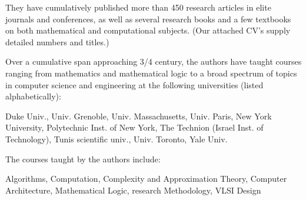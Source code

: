 \documentclass{article}[12pt]
\begin{document}
\smallskip

\noindent
They have cumulatively published more than 450 research articles in elite journals and conferences, as well as several research books and a few textbooks on both mathematical and computational subjects.  (Our attached CV's supply detailed numbers and titles.)

\bigskip

\noindent
Over a cumulative span approaching 3/4 century, the authors have taught courses ranging from mathematics and mathematical logic to a broad spectrum of topics in computer science and engineering at the following universities (listed alphabetically):

\smallskip

\noindent
Duke Univ., 
Univ. Grenoble,
Univ. Massachusetts,
Univ. Paris,
New York University,
Polytechnic Inst. of New York,
The Technion (Israel Inst. of Technology),
Tunis scientific univ.,
Univ. Toronto,
Yale Univ.
\smallskip

\noindent
The courses taught by the authors include:
\smallskip

\noindent
Algorithms,
Computation, Complexity and Approximation Theory,
Computer Architecture,
Mathematical Logic,
research Methodology,
VLSI Design
\end{document}

